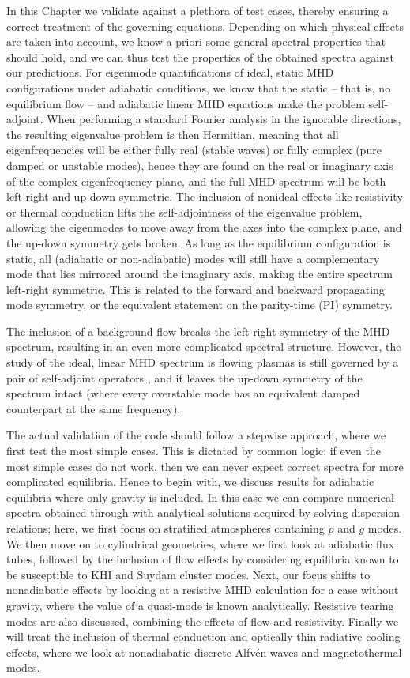In this Chapter we validate {\legolas} against a plethora of test cases, thereby ensuring a correct treatment of the governing equations. Depending on which physical effects are taken into account, we know a priori some general spectral properties that should hold, and we can thus test the properties of the obtained spectra against our predictions. For eigenmode quantifications of ideal, static MHD configurations under adiabatic conditions, we know that the static -- that is, no equilibrium flow -- and adiabatic linear MHD equations make the problem self-adjoint. When performing a standard Fourier analysis in the ignorable directions, the resulting eigenvalue problem is then Hermitian, meaning that all eigenfrequencies will be either fully real (stable waves) or fully complex (pure damped or unstable modes), hence they are found on the real or imaginary axis of the complex eigenfrequency plane, and the full MHD spectrum will be both left-right and up-down symmetric. The inclusion of nonideal effects like resistivity or thermal conduction lifts the self-adjointness of the eigenvalue problem, allowing the eigenmodes to move away from the axes into the complex plane, and the up-down symmetry gets broken. As long as the equilibrium configuration is static, all (adiabatic or non-adiabatic) modes will still have a complementary mode that lies mirrored around the imaginary axis, making the entire spectrum left-right symmetric. This is related to the forward and backward propagating mode symmetry, or the equivalent statement on the parity-time (\gls{PI}) symmetry.

The inclusion of a background flow breaks the left-right symmetry of the MHD spectrum, resulting in an even more complicated spectral structure. However, the study of the ideal, linear MHD spectrum is flowing plasmas is still governed by a pair of self-adjoint operators \citep{goedbloed2011,book_MHD}, and it leaves the up-down symmetry of the spectrum intact (where every overstable mode has an equivalent damped counterpart at the same frequency).

The actual validation of the code should follow a stepwise approach, where we first test the most simple cases. This is dictated by common logic: if even the most simple cases do not work, then we can never expect correct spectra for more complicated equilibria. Hence to begin with, we discuss results for adiabatic equilibria where only gravity is included. In this case we can compare numerical spectra obtained through {\legolas} with analytical solutions acquired by solving dispersion relations; here, we first focus on stratified atmospheres containing $p$ and $g$ modes. We then move on to cylindrical geometries, where we first look at adiabatic flux tubes, followed by the inclusion of flow effects by considering equilibria known to be susceptible to KHI and Suydam cluster modes. Next, our focus shifts to nonadiabatic effects by looking at a resistive MHD calculation for a case without gravity, where the value of a quasi-mode is known analytically. Resistive tearing modes are also discussed, combining the effects of flow and resistivity. Finally we will treat the inclusion of thermal conduction and optically thin radiative cooling effects, where we look at nonadiabatic discrete Alfv\'en waves and magnetothermal modes.


